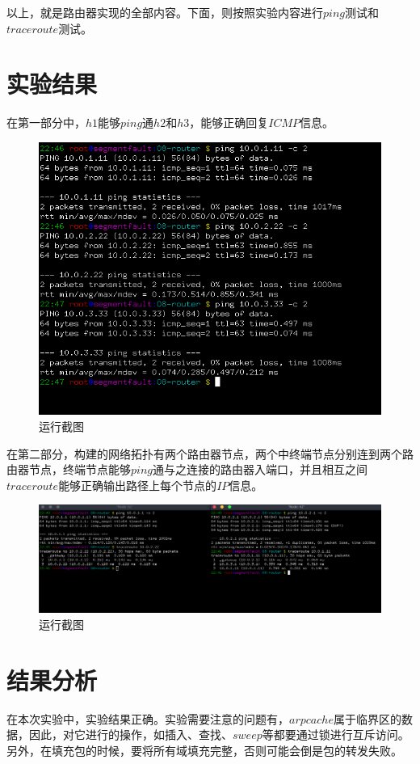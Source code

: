 \documentclass[UTF8,noindent]{ctexart}
\begin{document}
以上，就是路由器实现的全部内容。下面，则按照实验内容进行$ping$测试和$traceroute$测试。
\section*{{实验结果}}
在第一部分中，$h1$能够$ping$通$h2$和$h3$，能够正确回复$ICMP$信息。
\begin{figure}[H]
  \centering
  \includegraphics[scale=0.6]{1.png}
  \caption{运行截图}
\end{figure}

在第二部分，构建的网络拓扑有两个路由器节点，两个中终端节点分别连到两个路由器节点，终端节点能够$ping$通与之连接的路由器入端口，并且相互之间$traceroute$能够正确输出路径上每个节点的$IP$信息。
\begin{figure}[H]
  \centering
  \includegraphics[scale=0.3]{2.png}
  \caption{运行截图}
\end{figure}

\section*{{结果分析}}
在本次实验中，实验结果正确。实验需要注意的问题有，$arpcache$属于临界区的数据，因此，对它进行的操作，如插入、查找、$sweep$等都要通过锁进行互斥访问。另外，在填充包的时候，要将所有域填充完整，否则可能会倒是包的转发失败。
\end{document}
